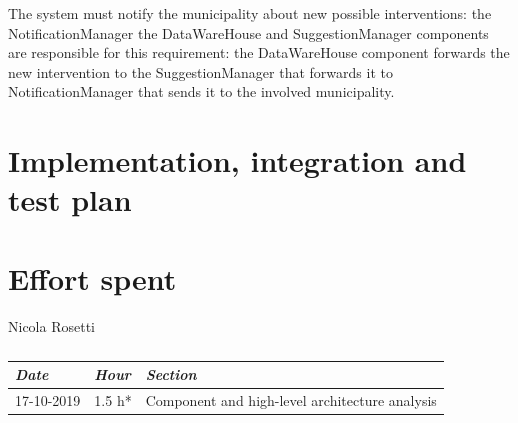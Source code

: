 \documentclass[a4paper]{report}
\begin{document}
\begin{enumerate}[start=1,label={[R\arabic*]}]
\item The system must notify the municipality about new possible interventions: the NotificationManager the DataWareHouse and SuggestionManager components are responsible for this requirement: the DataWareHouse component forwards the new intervention to the SuggestionManager that forwards it to NotificationManager that sends it to  the involved municipality.

\end{enumerate}

\chapter{Implementation, integration and test plan}

\chapter{Effort spent}

\begin{table}[H]
\centering
Nicola Rosetti \\
\begin{tabular}{p{2cm}p{1.5cm}p{7cm}}
\toprule
\textit{Date} & \textit{Hour} & \textit{Section} \\ \midrule
17-10-2019 & 1.5 h* & Component and high-level architecture analysis \\ \midrule
\bottomrule
\end{tabular}
\caption[Nicola Rosetti's effort table]{}
\end{table}
\end{document}
